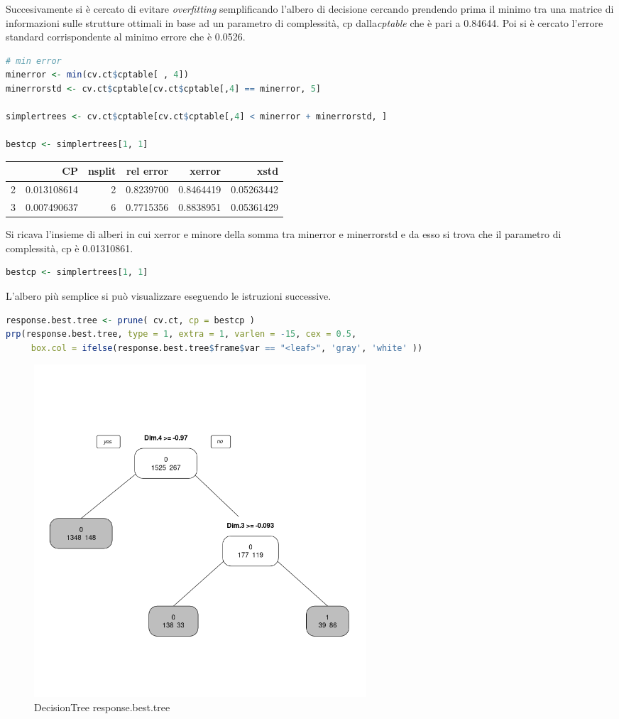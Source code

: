 \documentclass[letterpaper,11pt]{article}
\begin{document}
Succesivamente si è cercato di evitare \textit{overfitting} semplificando l'albero di decisione cercando prendendo prima il minimo tra una matrice di informazioni sulle strutture ottimali in base ad un parametro di complessità, cp dalla\textit{cptable} che è pari a 0.84644.
Poi si è cercato l'errore standard corrispondente al minimo errore che è 0.0526.  

\begin{lstlisting}[language=R]
# min error
minerror <- min(cv.ct$cptable[ , 4])
minerrorstd <- cv.ct$cptable[cv.ct$cptable[,4] == minerror, 5]

simplertrees <- cv.ct$cptable[cv.ct$cptable[,4] < minerror + minerrorstd, ]

bestcp <- simplertrees[1, 1]
\end{lstlisting}
\begin{table}[ht]
\centering
\begin{tabular}{rrrrrr}
  \hline
 & CP & nsplit & rel error & xerror & xstd \\ 
  \hline
  2 & 0.013108614 & 2 & 0.8239700 & 0.8464419 & 0.05263442 \\ 
  3 & 0.007490637  & 6 & 0.7715356 & 0.8838951 & 0.05361429 \\ 
  
   \hline
\end{tabular}
\end{table}

Si ricava l'insieme di alberi in cui xerror e minore della somma tra minerror e minerrorstd e da esso si trova che il parametro di complessità, cp è 0.01310861. 

\begin{lstlisting}[language=R]
bestcp <- simplertrees[1, 1]
\end{lstlisting}
L'albero più semplice si può visualizzare eseguendo le istruzioni successive.

\begin{lstlisting}[language=R]
response.best.tree <- prune( cv.ct, cp = bestcp )
prp(response.best.tree, type = 1, extra = 1, varlen = -15, cex = 0.5,
     box.col = ifelse(response.best.tree$frame$var == "<leaf>", 'gray', 'white' ))
\end{lstlisting}


\begin{figure}[H]
    \centering
    \includegraphics[width=0.6\textwidth]{Img/D-TREE/D-TREE002.png}
    \caption{DecisionTree response.best.tree}
\end{figure}
\end{document}

